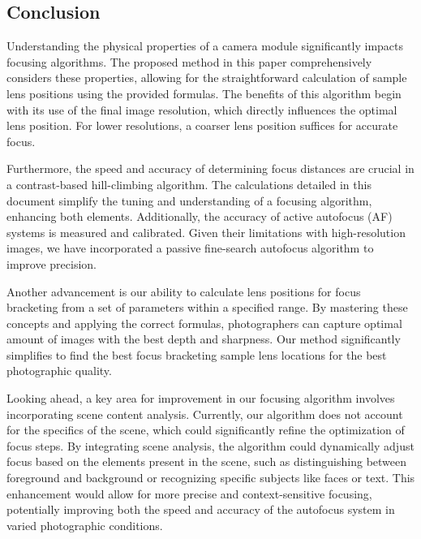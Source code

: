 \documentclass{article}
\begin{document}
\subsection{Conclusion}
\label{sec:conclusion}

Understanding the physical properties of a camera module significantly impacts focusing algorithms. The proposed method in this paper comprehensively considers these properties, allowing for the straightforward calculation of sample lens positions using the provided formulas. The benefits of this algorithm begin with its use of the final image resolution, which directly influences the optimal lens position. For lower resolutions, a coarser lens position suffices for accurate focus.

Furthermore, the speed and accuracy of determining focus distances are crucial in a contrast-based hill-climbing algorithm. The calculations detailed in this document simplify the tuning and understanding of a focusing algorithm, enhancing both elements. Additionally, the accuracy of active autofocus (AF) systems is measured and calibrated. Given their limitations with high-resolution images, we have incorporated a passive fine-search autofocus algorithm to improve precision.

Another advancement is our ability to calculate lens positions for focus bracketing from a set of parameters within a specified range. By mastering these concepts and applying the correct formulas, photographers can capture optimal amount of images with the best depth and sharpness. Our method significantly simplifies to find the best focus bracketing sample lens locations for the best photographic quality.

Looking ahead, a key area for improvement in our focusing algorithm involves incorporating scene content analysis. Currently, our algorithm does not account for the specifics of the scene, which could significantly refine the optimization of focus steps. By integrating scene analysis, the algorithm could dynamically adjust focus based on the elements present in the scene, such as distinguishing between foreground and background or recognizing specific subjects like faces or text. This enhancement would allow for more precise and context-sensitive focusing, potentially improving both the speed and accuracy of the autofocus system in varied photographic conditions.

\end{document}
